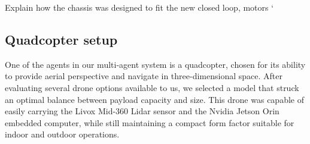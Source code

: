 \documentclass[11pt]{article}
\begin{document}
            \begin{figure}[H]
                \centering 
            \end{figure}


            Explain how the chassis was designed to fit the new closed loop, motors
`
        \subsection{Quadcopter setup}
                

                One of the agents in our multi-agent system is a quadcopter, chosen for its ability to provide aerial perspective and navigate in three-dimensional space. After evaluating several drone options available to us, we selected a model that struck an optimal balance between payload capacity and size. This drone was capable of easily carrying the Livox Mid-360 Lidar sensor and the Nvidia Jetson Orin embedded computer, while still maintaining a compact form factor suitable for indoor and outdoor operations.
\end{document}
